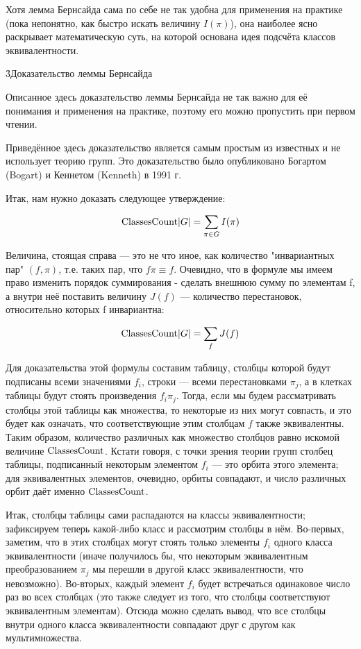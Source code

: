 Хотя лемма Бернсайда сама по себе не так удобна для применения на практике (пока непонятно, как быстро искать величину $I(\pi)$), она наиболее ясно раскрывает математическую суть, на которой основана идея подсчёта классов эквивалентности.

\h3{Доказательство леммы Бернсайда}

Описанное здесь доказательство леммы Бернсайда не так важно для её понимания и применения на практике, поэтому его можно пропустить при первом чтении.

Приведённое здесь доказательство является самым простым из известных и не использует теорию групп. Это доказательство было опубликовано Богартом (Bogart) и Кеннетом (Kenneth) в 1991 г.

Итак, нам нужно доказать следующее утверждение:

$$ {\rm ClassesCount} |G| = \sum_{\pi \in G} I(\pi) $$

Величина, стоящая справа --- это не что иное, как количество "инвариантных пар" $(f, \pi)$, т.е. таких пар, что $f \pi \equiv f$. Очевидно, что в формуле мы имеем право изменить порядок суммирования - сделать внешнюю сумму по элементам f, а внутри неё поставить величину $J(f)$ --- количество перестановок, относительно которых f инвариантна:

$$ {\rm ClassesCount} |G| = \sum_{f} J(f) $$

Для доказательства этой формулы составим таблицу, столбцы которой будут подписаны всеми значениями $f_i$, строки --- всеми перестановками $\pi_j$, а в клетках таблицы будут стоять произведения $f_i \pi_j$. Тогда, если мы будем рассматривать столбцы этой таблицы как множества, то некоторые из них могут совпасть, и это будет как означать, что соответствующие этим столбцам $f$ также эквивалентны. Таким образом, количество различных как множество столбцов равно искомой величине $\rm ClassesCount$. Кстати говоря, с точки зрения теории групп столбец таблицы, подписанный некоторым элементом $f_i$ --- это орбита этого элемента; для эквивалентных элементов, очевидно, орбиты совпадают, и число различных орбит даёт именно $\rm ClassesCount$.

Итак, столбцы таблицы сами распадаются на классы эквивалентности; зафиксируем теперь какой-либо класс и рассмотрим столбцы в нём. Во-первых, заметим, что в этих столбцах могут стоять только элементы $f_i$ одного класса эквивалентности (иначе получилось бы, что некоторым эквивалентным преобразованием $\pi_j$ мы перешли в другой класс эквивалентности, что невозможно). Во-вторых, каждый элемент $f_i$ будет встречаться одинаковое число раз во всех столбцах (это также следует из того, что столбцы соответствуют эквивалентным элементам). Отсюда можно сделать вывод, что все столбцы внутри одного класса эквивалентности совпадают друг с другом как мультимножества.

